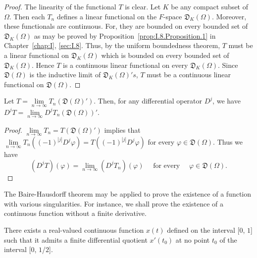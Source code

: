 \begin{proof}
 The linearity of the functional $T$ is clear. Let $K$ be any compact subset of $\Omega$. Then each $T_n$ defines a linear functional on the $F$-space $\mathfrak{D}_K(\Omega)$. Moreover, these functionals are continuous. For, they are bounded on every bounded set of $\mathfrak{D}_K(\Omega)$ as may be proved by Proposition~\ref{prop:I.8.Proposition.1} in Chapter~\ref{chap:I}, \ref{sec:I.8}. Thus, by the uniform boundedness theorem, $T$ must be a linear functional on $\mathfrak{D}_K(\Omega)$ which is bounded on every bounded set of $\mathfrak{D}_K(\Omega)$. Hence $T$ is a continuous linear functional on every $\mathfrak{D}_K(\Omega)$. Since $\mathfrak{D}(\Omega)$ is the inductive limit of $\mathfrak{D}_K(\Omega)'s$, $T$ must be a continuous linear functional on $\mathfrak{D}(\Omega)$. 
\end{proof}

\begin{corollaryn} Let $T = \lim\limits_{n\to \infty}T_n(\mathfrak{D}(\Omega)')$. Then, for any differential operator $D^j$, we have $D^{j}T = \lim\limits_{n\to \infty}D^{j}T_{n}(\mathfrak{D}(\Omega))'$.

\end{corollaryn}
\begin{proof}
 $\lim\limits_{n\to \infty}T_n = T(\mathfrak{D}(\Omega)')$ implies that $\lim\limits_{n\to \infty}T_n((-1)^{|j|}D^j\varphi) = T((-1)^{|j|}D^j\varphi)$ for every $\varphi \in \mathfrak{D}(\Omega)$. Thus we have 
\[
(D ^{j} T) (\varphi) = \lim\limits _{n \rightarrow \infty} (D ^{j} T _{n}) (\varphi) \quad \text{ for every } \quad \varphi \in \mathfrak {D} (\Omega). \]
\end{proof}


\label{sec:II.4}

The Baire-Hausdorff theorem may be applied to prove the existence of a function with various singularities. For instance, we shall prove the existence of a continuous function without a finite derivative. 

\begin{theoremn} There exists a real-valued continuous function $x(t)$ defined on the interval [$0$, $1$] such that it admits a finite differential quotient $x'(t_0)$ at no point $t_0$ of the interval [$0$, $1$/$2$]. 
\end{theoremn}

